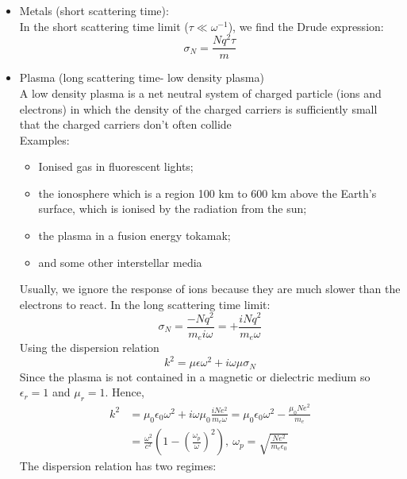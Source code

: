 \documentclass[a4paper, 11pt, normalem]{report}
\newcommand\eno{\epsilon_0}
\newcommand\er{\epsilon_r}
\newcommand\e{\epsilon}
\begin{document}
\begin{itemize}
    \item Metals (short scattering time): \\
    In the short scattering time limit ($\tau \ll \omega^{-1}$), we find the Drude expression:
    \begin{equation*}
        \sigma_N = \frac{Nq^2\tau}{m}
    \end{equation*}
    \item Plasma (long scattering time- low density plasma) \\
        A low density plasma is a net neutral system of charged particle (ions and electrons) in which the density of the charged carriers is sufficiently small that the charged carriers don't often collide \\
        Examples:
        \begin{itemize}
            \item Ionised gas in fluorescent lights;
            \item the ionosphere which is a region 100 km to 600 km above the Earth's surface, which is ionised by the radiation from the sun;
            \item the plasma in a fusion energy tokamak;
            \item and some other interstellar media
        \end{itemize}
        Usually, we ignore the response of ions because they are much slower than the electrons to react. In the long scattering time limit:
        \begin{equation*}
            \sigma_N = \frac{-Nq^2}{m_ei\omega} = +\frac{iNq^2}{m_e\omega}
        \end{equation*}
        Using the dispersion relation
        \begin{equation*}
            k^2 = \mu\e\omega^2 + i\omega\mu\sigma_N
        \end{equation*}
        Since the plasma is not contained in a magnetic or dielectric medium so $\er = 1$ and $\mu_r = 1$. Hence,
        \begin{align*}
            k^2 &= \mu_0\eno\omega^2 + i\omega\mu_0\frac{iNe^2}{m_e\omega} = \mu_0\eno\omega^2 - \frac{\mu_0Ne^2}{m_e} \\
                &= \frac{\omega^2}{c^2}\left(1 - \left(\frac{\omega_p}{\omega}\right)^2\right),~ \omega_p = \sqrt{\frac{Ne^2}{m_e\eno}}
        \end{align*}
        The dispersion relation has two regimes:
        \begin{enumerate}

\end{enumerate}
\end{itemize}
\end{document}
